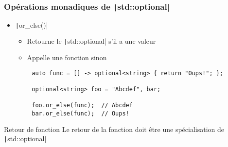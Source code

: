 \documentclass[C++.tex]{subfiles}
\begin{document}
\begin{frame}[fragile]
	\frametitle{Opérations monadiques de \texttt|std::optional|}
	\begin{itemize}
		\item \texttt|or_else()| 
		\begin{itemize}
			\item Retourne le \texttt|std::optional| s'il a une valeur
			\item Appelle une fonction sinon
		\end{itemize}
	\end{itemize}

	\begin{verbatim}
		auto func = [] -> optional<string> { return "Oups!"; };

		optional<string> foo = "Abcdef", bar;

		foo.or_else(func);  // Abcdef
		bar.or_else(func);  // Oups!
	\end{verbatim}

	\begin{alertblock}{Retour de fonction}
		Le retour de la fonction doit être une spécialisation de \texttt|std::optional|
	\end{alertblock}


\end{frame}
\end{document}
